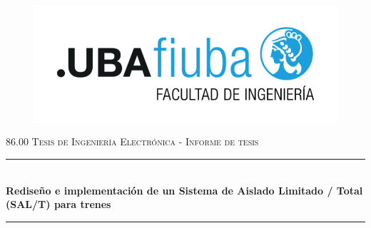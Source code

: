\documentclass[11pt,a4paper]{article}
\begin{document}

\begin{titlepage}	
	\centering



	\begin{figure}[h]
		\centering
		\includegraphics[scale=1]{img/logo_fiuba_new.pdf} 	
	\end{figure}
	\vspace*{2cm}

\huge{\textsc{86.00 Tesis de Ingeniería Electrónica - Informe de tesis\\}}\vspace{.3cm}
	
	\newcommand{\LargoDeBarra}{1}  %
	
	\rule{\LargoDeBarra\linewidth}{0.3 mm} \\[0.1 cm]
	\LARGE{\textbf{Rediseño e implementación de un Sistema de Aislado Limitado / Total (SAL/T) para trenes}} \\[-0.3 cm]
	\rule{\LargoDeBarra\linewidth}{0.3 mm}

\vspace*{2cm}

    \begin{table}[htb]


\end{table}
\end{titlepage}
\end{document}
